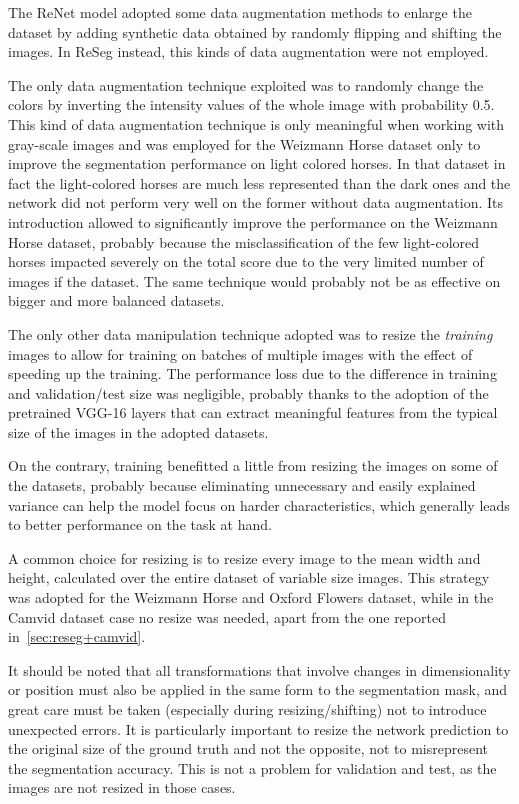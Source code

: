 The ReNet model adopted some data augmentation methods to enlarge the dataset
by adding synthetic data obtained by randomly flipping and shifting the images.
In ReSeg instead, this kinds of data augmentation were not employed.

The only data augmentation technique exploited was to randomly change the
colors by inverting the intensity values of the whole image with probability
0.5. This kind of data augmentation technique is only meaningful when working
with gray-scale images and was employed for the Weizmann Horse dataset only to
improve the segmentation performance on light colored horses. In that dataset
in fact the light-colored horses are much less represented than the dark ones
and the network did not perform very well on the former without data
augmentation. Its introduction allowed to significantly improve the performance
on the Weizmann Horse dataset, probably because the misclassification of the
few light-colored horses impacted severely on the total score due to the very
limited number of images if the dataset. The same technique would probably not
be as effective on bigger and more balanced datasets.

The only other data manipulation technique adopted was to resize the
\emph{training} images to allow for training on batches of multiple images with
the effect of speeding up the training. The performance loss due to the
difference in training and validation/test size was negligible, probably thanks
to the adoption of the pretrained VGG-16 layers that can extract meaningful
features from the typical size of the images in the adopted datasets.

On the contrary, training benefitted a little from resizing the images on some
of the datasets, probably because eliminating unnecessary and easily explained
variance can help the model focus on harder characteristics, which generally
leads to better performance on the task at hand.

A common choice for resizing is to resize every image to the mean width and
height, calculated over the entire dataset of variable size images. This
strategy was adopted for the Weizmann Horse and Oxford Flowers dataset, while
in the Camvid dataset case no resize was needed, apart from the one reported
in~\autoref{sec:reseg+camvid}.

It should be noted that all transformations that involve changes in
dimensionality or position must also be applied in the same form to the
segmentation mask, and great care must be taken (especially during
resizing/shifting) not to introduce unexpected errors. It is particularly
important to resize the network prediction to the original size of the ground
truth and not the opposite, not to misrepresent the segmentation accuracy.
This is not a problem for validation and test, as the images are not resized in
those cases.


